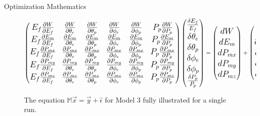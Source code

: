 \documentclass[final]{beamer}
\newlength{\colwidth}
\begin{document}
\begin{frame}[t]
\begin{columns}[t]
\begin{column}{\colwidth}
\begin{exampleblock}{Optimization Mathematics}
\begin{figure}
\vspace{-1.5cm}$$\Large\begin{pmatrix}
E_f \frac{\partial W}{\partial E_f} & \frac{\partial W}{\partial \theta_e} & \frac{\partial W}{\partial \theta_p} & \frac{\partial W}{\partial \phi_e} & \frac{\partial W}{\partial \phi_p} & P_p \frac{\partial W}{\partial P_p} \\
E_f \frac{\partial E_m}{\partial E_f} & \frac{\partial E_m}{\partial \theta_e} & \frac{\partial E_m}{\partial \theta_p} & \frac{\partial E_m}{\partial \phi_e} & \frac{\partial E_m}{\partial \phi_p} & P_p \frac{\partial E_m}{\partial P_p} \\
E_f \frac{\partial P_{mx}}{\partial E_f} & \frac{\partial P_{mx}}{\partial \theta_e} & \frac{\partial P_{mx}}{\partial \theta_p} & \frac{\partial P_{mx}}{\partial \phi_e} & \frac{\partial P_{mx}}{\partial \phi_p} & P_p \frac{\partial P_{mx}}{\partial P_p} \\
E_f \frac{\partial P_{my}}{\partial E_f} & \frac{\partial P_{my}}{\partial \theta_e} & \frac{\partial P_{my}}{\partial \theta_p} & \frac{\partial P_{my}}{\partial \phi_e} & \frac{\partial P_{my}}{\partial \phi_p} & P_p \frac{\partial P_{my}}{\partial P_p} \\
E_f \frac{\partial P_{mz}}{\partial E_f} & \frac{\partial P_{mz}}{\partial \theta_e} & \frac{\partial P_{mz}}{\partial \theta_p} & \frac{\partial P_{mz}}{\partial \phi_e} & \frac{\partial P_{mz}}{\partial \phi_p} & P_p \frac{\partial P_{mz}}{\partial P_p}
\end{pmatrix}\begin{pmatrix}
 \frac{\delta E_f}{E_f} \\ \delta \theta_e \\ \delta \theta_p \\ \delta \phi_e \\ \delta \phi_p \\ \frac{\delta P_p}{P_p}
\end{pmatrix}=\begin{pmatrix} dW \\ dE_m \\ dP_{mx} \\ dP_{my} \\ dP_{mz} \end{pmatrix}+\begin{pmatrix} \hat{\epsilon}_{dW} \\ \hat{\epsilon}_{dE_m} \\ \hat{\epsilon}_{P_{mx}} \\ \hat{\epsilon}_{P_{my}} \\ \hat{\epsilon}_{P_{mz}} \end{pmatrix}
$$
\vspace{-1cm}
\caption{The equation $\mathbb{M}\vec{x}=\vec{y}+\hat\epsilon$ for Model 3 fully illustrated for a single run.}
\end{figure}    


\end{exampleblock}
\end{column}
\end{columns}
\end{frame}
\end{document}

